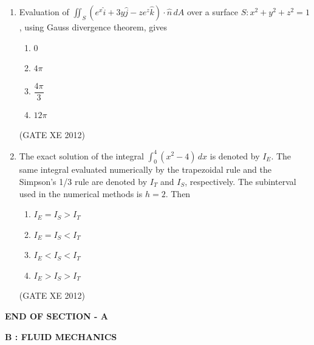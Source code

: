 \documentclass[12pt]{article}
\begin{document}
\begin{enumerate}
(GATE XE 2012)

\item Evaluation of $\iint_{S}(e^{x}\hat{i} + 3y\hat{j} - ze^{z}\hat{k}) \cdot \hat{n} \, dA$ over a surface $S: x^{2}+y^{2}+z^{2}=1$, using Gauss divergence theorem, gives
\begin{multicols}{2}
\begin{enumerate}
\item 0
\item $4\pi$
\item $\dfrac{4\pi}{3}$
\item $12\pi$
\end{enumerate}
\end{multicols}

(GATE XE 2012)

\item The exact solution of the integral $\int_{0}^{4}(x^{2}-4)\,dx$ is denoted by $I_{E}$. The same integral evaluated numerically by the trapezoidal rule and the Simpson’s 1/3 rule are denoted by $I_{T}$ and $I_{S}$, respectively. The subinterval used in the numerical methods is $h=2$. Then
\begin{multicols}{2}
\begin{enumerate}
\item $I_{E} = I_{S} > I_{T}$
\item $I_{E} = I_{S} < I_{T}$
\item $I_{E} < I_{S} < I_{T}$
\item $I_{E} > I_{S} > I_{T}$
\end{enumerate}
\end{multicols}

(GATE XE 2012)

\end{enumerate}

\begin{center}
\textbf{END OF SECTION - A}
\end{center}

\newpage

\begin{center}
{\Large \textbf{B : FLUID MECHANICS}}
\end{center}
\end{document}
